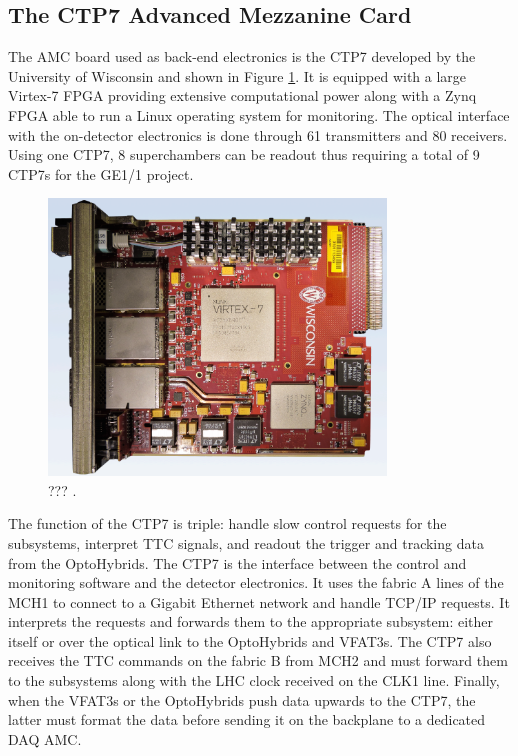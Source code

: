     \subsection{The CTP7 Advanced Mezzanine Card}

      The AMC board used as back-end electronics is the CTP7 \cite{CTP7} developed by the University of Wisconsin and shown in Figure \ref{fig:II-2-ctp7}. It is equipped with a large Virtex-7 FPGA providing extensive computational power along with a Zynq FPGA able to run a Linux operating system for monitoring. The optical interface with the on-detector electronics is done through 61 transmitters and 80 receivers. Using one CTP7, 8 superchambers can be readout thus requiring a total of 9 CTP7s for the GE1/1 project. \\

      \begin{figure}[h!]
        \centering
        \includegraphics[width=0.8\textwidth]{img/II-2-daq/ctp7.png}
        \caption{??? \cite{???}.}
        \label{fig:II-2-ctp7}
      \end{figure}

      The function of the CTP7 is triple: handle slow control requests for the subsystems, interpret TTC signals, and readout the trigger and tracking data from the OptoHybrids. The CTP7 is the interface between the control and monitoring software and the detector electronics. It uses the fabric A lines of the MCH1 to connect to a Gigabit Ethernet network and handle TCP/IP requests. It interprets the requests and forwards them to the appropriate subsystem: either itself or over the optical link to the OptoHybrids and VFAT3s. The CTP7 also receives the TTC commands on the fabric B from MCH2 and must forward them to the subsystems along with the LHC clock received on the CLK1 line. Finally, when the VFAT3s or the OptoHybrids push data upwards to the CTP7, the latter must format the data before sending it on the backplane to a dedicated DAQ AMC.

